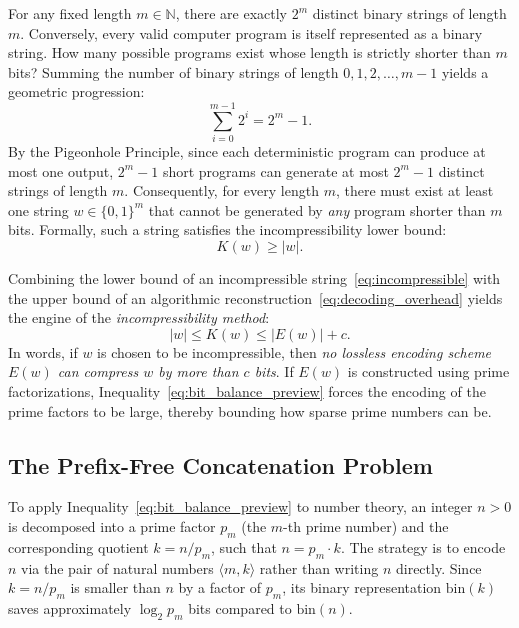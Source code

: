 \documentclass[acmsmall,natbib=false,nonacm]{acmart}
\begin{document}
For any fixed length $m \in \mathbb{N}$, there are exactly $2^m$ distinct binary strings of length $m$. Conversely, every valid computer program is itself represented as a binary string. How many possible programs exist whose length is strictly shorter than $m$ bits? Summing the number of binary strings of length $0, 1, 2, \dots, m - 1$ yields a geometric progression:
\begin{equation}
    \sum_{i=0}^{m-1} 2^i = 2^m - 1.
\end{equation}
By the Pigeonhole Principle, since each deterministic program can produce at most one output, $2^m - 1$ short programs can generate at most $2^m - 1$ distinct strings of length $m$. Consequently, for every length $m$, there must exist at least one string $w \in \{0, 1\}^m$ that cannot be generated by \textit{any} program shorter than $m$ bits. Formally, such a string satisfies the incompressibility lower bound:
\begin{equation}
    \label{eq:incompressible}
    K(w) \ge |w|.
\end{equation}

Combining the lower bound of an incompressible string~\eqref{eq:incompressible} with the upper bound of an algorithmic reconstruction~\eqref{eq:decoding_overhead} yields the engine of the \textit{incompressibility method}:
\begin{equation}
    \label{eq:bit_balance_preview}
    |w| \le K(w) \le |E(w)| + c.
\end{equation}
In words, if $w$ is chosen to be incompressible, then \textit{no lossless encoding scheme $E(w)$ can compress $w$ by more than $c$ bits}. If $E(w)$ is constructed using prime factorizations, Inequality~\eqref{eq:bit_balance_preview} forces the encoding of the prime factors to be large, thereby bounding how sparse prime numbers can be.

\subsection{The Prefix-Free Concatenation Problem}
To apply Inequality~\eqref{eq:bit_balance_preview} to number theory, an integer $n > 0$ is decomposed into a prime factor $p_m$ (the $m$-th prime number) and the corresponding quotient $k = n / p_m$, such that $n = p_m \cdot k$. The strategy is to encode $n$ via the pair of natural numbers $\langle m, k\rangle$ rather than writing $n$ directly. Since $k = n / p_m$ is smaller than $n$ by a factor of $p_m$, its binary representation $\text{bin}(k)$ saves approximately $\log_2 p_m$ bits compared to $\text{bin}(n)$.
\end{document}
